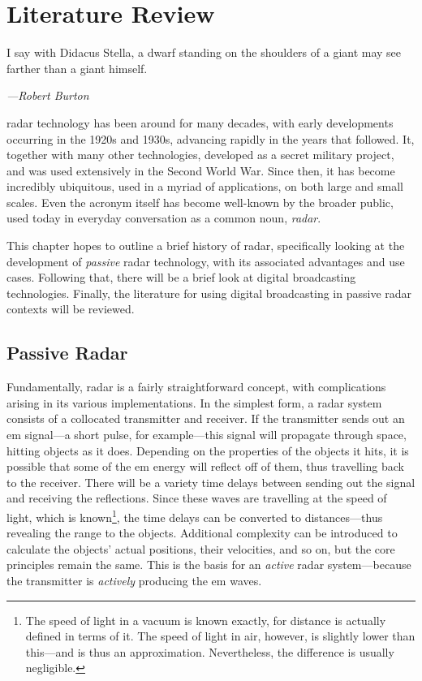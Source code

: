 \documentclass[class=report,11pt,crop=false]{standalone}
\begin{document}
\tableofcontents

\chapter{Literature Review}
\epigraph{I say with Didacus Stella, a dwarf standing on the shoulders of a giant may see farther than a giant himself.}%
    {\emph{---Robert Burton}}

 \gls{radar} technology has been around for many decades, with early developments occurring in the 1920s and 1930s, advancing rapidly in the years that followed. It, together with many other technologies, developed as a secret military project, and was used extensively in the Second World War. Since then, it has become incredibly ubiquitous, used in a myriad of applications, on both large and small scales. Even the acronym itself has become well-known by the broader public, used today in everyday conversation as a common noun, \emph{radar}.

This chapter hopes to outline a brief history of radar, specifically looking at the development of \emph{passive} radar technology, with its associated advantages and use cases. Following that, there will be a brief look at digital broadcasting technologies. Finally, the literature for using digital broadcasting in passive radar contexts will be reviewed.

\section{Passive Radar}

Fundamentally, radar is a fairly straightforward concept, with complications arising in its various implementations. In the simplest form, a radar system consists of a collocated transmitter and receiver. If the transmitter sends out an \gls{em} signal---a short pulse, for example---this signal will propagate through space, hitting objects as it does. Depending on the properties of the objects it hits, it is possible that some of the \gls{em} energy will reflect off of them, thus travelling back to the receiver. There will be a variety time delays between sending out the signal and receiving the reflections. Since these waves are travelling at the speed of light, which is known\footnote{The speed of light in a vacuum is known exactly, for distance is actually defined in terms of it. The speed of light in air, however, is slightly lower than this---and is thus an approximation. Nevertheless, the difference is usually negligible.}, the time delays can be converted to distances---thus revealing the range to the objects. Additional complexity can be introduced to calculate the objects' actual positions, their velocities, and so on, but the core principles remain the same. This is the basis for an \emph{active} radar system---because the transmitter is \emph{actively} producing the \gls{em} waves.
\end{document}
